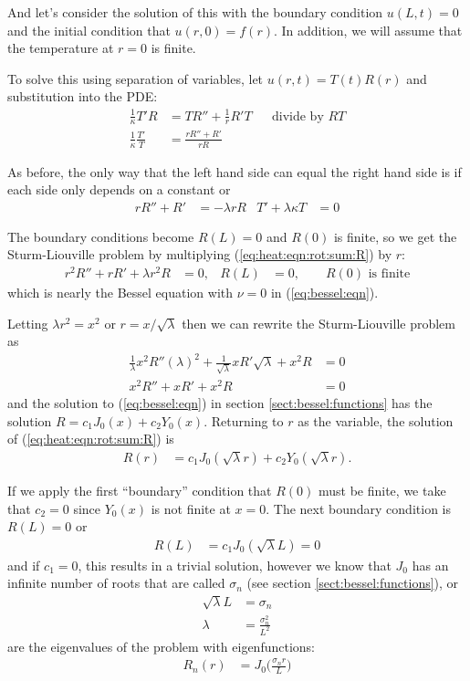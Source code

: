 And let's consider the solution of this with the boundary condition $u(L,t)=0$ and the initial condition that $u(r,0)=f(r)$.  In addition, we will assume that the temperature at $r=0$ is finite.  


To solve this using separation of variables, let $u(r,t)=T(t) R(r)$ and substitution into the PDE:
% 
\begin{align*}
\frac{1}{\kappa} T'R & = TR'' + \frac{1}{r} R' T && \text{divide by $RT$} \\
\frac{1}{\kappa} \frac{T'}{T} & = \frac{r R'' + R'}{r R} 
\end{align*}

As before, the only way that the left hand side can equal the right hand side is if each side only depends on a constant or
%
\begin{align}
r R'' + R' & = -\lambda r R & T' + \lambda \kappa T & = 0 
\label{eq:heat:eqn:rot:sym:R:T}
\end{align}

The boundary conditions become $R(L)=0$ and $R(0)$ is finite, so we get the Sturm-Liouville problem by multiplying (\ref{eq:heat:eqn:rot:sum:R}) by $r$:
%
\begin{align}
r^2 R'' + r R' + \lambda r^2 R & = 0, & R(L)& = 0, \qquad  R(0) \text{ is finite} 
\label{eq:heat:eqn:rot:sum:R}
\end{align}
which is nearly the Bessel equation with $\nu=0$ in (\ref{eq:bessel:eqn}).  

Letting $\lambda r^2 = x^2$ or $r=x/\sqrt{\lambda}$ then we can rewrite the Sturm-Liouville problem as
%
\begin{align*}
\frac{1}{\lambda} x^2  R'' (\lambda)^2 + \frac{1}{\sqrt{\lambda}} x  R' \sqrt{\lambda} + x^2 R & = 0 \\
x^2 R'' + xR' + x^2 R & = 0 
\end{align*}
and the solution to (\ref{eq:bessel:eqn}) in section \ref{sect:bessel:functions} has the solution $R= c_1 J_0(x) + c_2 Y_0(x)$.  Returning to $r$ as the variable, the solution of (\ref{eq:heat:eqn:rot:sum:R}) is 
%
\begin{align*}
R(r) & = c_1 J_0(\sqrt{\lambda} r) + c_2 Y_0(\sqrt{\lambda} r).  
\end{align*}


If we apply the first ``boundary'' condition that $R(0)$ must be finite, we take that $c_2=0$ since $Y_0(x)$ is not finite at $x=0$.  The next boundary condition is $R(L)=0$ or 
%
\begin{align*}
R(L) & = c_1 J_0(\sqrt{\lambda} L) = 0 
\end{align*}
and if $c_1=0$, this results in a trivial solution, however we know that $J_0$ has an infinite number of roots that are called $\sigma_n$ (see section \ref{sect:bessel:functions}), or
%
\begin{align*}
\sqrt{\lambda} L & = \sigma_n \\
\lambda & = \frac{\sigma_n^2}{L^2}  
\end{align*}
are the eigenvalues of the problem with  eigenfunctions:
%
\begin{align*}
R_n(r) & = J_0\biggl(\frac{\sigma_n r}{L}\biggr) 
\end{align*}


